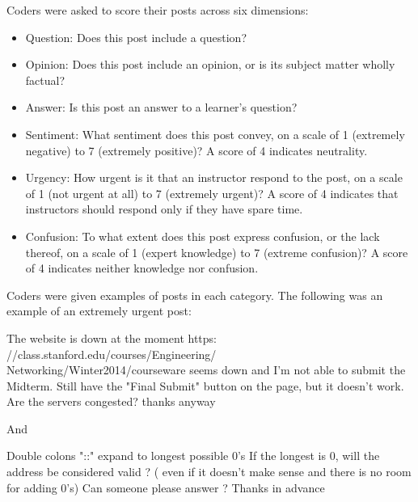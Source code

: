 \documentclass{edm_template}
\newcommand{\squishlist}{
 \begin{list}{$\bullet$}
 {
  \setlength{\itemsep}{0pt}
  \setlength{\parsep}{3pt}
  \setlength{\topsep}{3pt}
  \setlength{\partopsep}{0pt}
  \setlength{\leftmargin}{1.5em}
  \setlength{\labelwidth}{1em}
  \setlength{\labelsep}{0.5em} } }
\newcommand{\squishend}{
  \end{list}  }
\begin{document}
Coders were asked to score their posts across six dimensions:
\begin{itemize}
\vspace{-15pt}
       \setlength\itemsep{0.05em}
       \item Question: Does this post include a question?
       \item Opinion: Does this post include an opinion, or is its subject matter wholly factual?
       \item Answer: Is this post an answer to a learner's question?
       \item Sentiment: What sentiment does this post convey, on a scale of 1 (extremely negative) to 7 (extremely positive)? A score of 4 indicates neutrality.
       \item Urgency: How urgent is it that an instructor respond to the post, on a scale of 1 (not urgent at all) to 7 (extremely urgent)? A score of 4 indicates that instructors should respond only if they have spare time.
       \item Confusion: To what extent does this post express confusion, or the lack thereof, on a scale of 1 (expert knowledge) to 7 (extreme confusion)? A score of 4 indicates neither knowledge nor confusion.
\end{itemize}
\vspace{-15pt}
Coders were given examples of posts in each category. The following was an example of an extremely urgent post:

\vspace{-14pt}
\begin{displayquote}
The website is down at the moment
       https:\\//class.stanford.edu/courses/Engineering/\\Networking/Winter2014/courseware
       seems down and I'm not able to submit the Midterm. Still have
       the "Final Submit" button on the page, but it doesn't work. Are
       the servers congested? 
       thanks anyway
\end{displayquote}
\vspace{-14pt}

And

\vspace{-14pt}
\begin{displayquote}
Double colons "::"  expand to longest possible 0's  
       If the longest is 0, will  the address be considered valid ?  (
       even if it doesn't make sense and there is no room for adding
       0's) 
       Can someone please answer ?
       Thanks in advance
\end{displayquote}
\vspace{-14pt}
\end{document}
